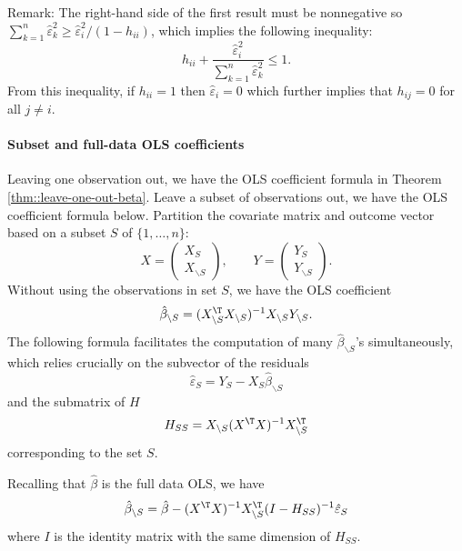 Remark: The right-hand side of the first result must be nonnegative so  $\sum_{k=1}^n   \hat{\varepsilon}_k^2 \geq \hat{\varepsilon}_{i}^{2}/(1-h_{ii})$, which 
implies the following inequality:
$$
h_{ii}  + \frac{  \hat{\varepsilon}_i^2 }{ \sum_{k=1}^n   \hat{\varepsilon}_k^2 } \leq 1.
$$
From this inequality, if $h_{ii} = 1$ then $\hat{\varepsilon}_i = 0$ which further implies that $h_{ij} = 0$ for all $j \neq i.$
 


 




\paragraph{Subset and full-data OLS coefficients}
\label{hw10::subset-ols-coef}


Leaving one observation out, we have the OLS coefficient formula in Theorem \ref{thm::leave-one-out-beta}. Leave a subset of observations out, we have the OLS coefficient formula below. Partition the covariate matrix and outcome vector based on a subset $S$ of $\{1, \ldots, n\}$:
$$
X = \begin{pmatrix}
X_S\\
X_{\backslash S}
\end{pmatrix},\qquad 
Y = \begin{pmatrix}
Y_S\\
Y_{\backslash S}
\end{pmatrix} .
$$  
Without using the observations in set $S$, we have the OLS coefficient 
$$
\hat\beta_{\backslash S} = (X_{\backslash S}^{\T} X_{\backslash S})^{-1} X_{\backslash S}Y_{\backslash S}.
$$
The following formula facilitates the computation of many $\hat\beta_{\backslash S} $'s simultaneously, which relies crucially on the subvector of the residuals 
$$
\hat{\varepsilon}_S = Y_S - X_S\hat\beta_{\backslash S} 
$$  
and the submatrix of $H$
$$
H_{SS} = X_{\backslash S}(X^{\T}X)^{-1}X_{\backslash S}^{\T}
$$
corresponding to the set $S$. 

\begin{theorem}\label{thm::leave-subset-out-beta}
Recalling that $\hat{\beta}$ is the full data OLS, we have
\[
\hat\beta_{\backslash S}   =\hat{\beta}- (X^{\T}X)^{-1}  X_{\backslash S}^{\T} (I-H_{SS})^{-1} \hat{\varepsilon}_S 
\]
where $I$ is the identity matrix with the same dimension of $H_{SS}$. 
\end{theorem}


